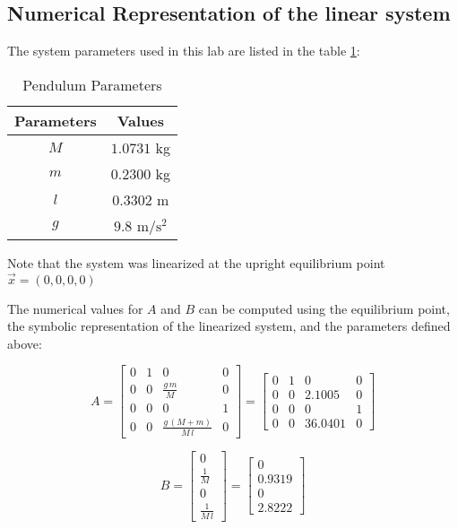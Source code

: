 \documentclass[10pt]{article}
\begin{document}
\subsection{Numerical Representation of the linear system}
The system parameters used in this lab are listed in the table \ref{tab:sys_param}:
\begin{table}[hbt!]
    \centering
    \begin{tabular}{c|c}
    \textbf{Parameters} & \textbf{Values} \\
    \hline
         $M$ & $1.0731$ kg \\
         $m$ & $0.2300$ kg \\
         $l$ & $0.3302$ m \\
         $g$ & $9.8$ m/$\text{s}^2$
    \end{tabular}
    \caption{Pendulum Parameters}
    \label{tab:sys_param}
\end{table}

Note that the system was linearized at the upright equilibrium point $\vec{x} = (0, 0, 0, 0)$

The numerical values for $A$ and $B$ can be computed using the equilibrium point, the symbolic representation of the linearized system, and the parameters defined above:

\begin{equation*}
    A = \begin{bmatrix} 0 & 1 & 0 & 0\\ 0 & 0 & \frac{g\,m}{M} & 0\\ 0 & 0 & 0 & 1\\ 0 & 0 & \frac{g\,\left(M+m\right)}{M\,l} & 0 \end{bmatrix} = \begin{bmatrix} 0 & 1 & 0 & 0\\ 0 & 0 & 2.1005 & 0\\ 0 & 0 & 0 & 1\\ 0 & 0 & 36.0401 & 0 \end{bmatrix}
\end{equation*}

\begin{equation*}
    B = \begin{bmatrix} 0\\ \frac{1}{M}\\ 0\\ \frac{1}{M\,l} \end{bmatrix} = \begin{bmatrix} 0\\ 0.9319\\ 0\\ 2.8222 \end{bmatrix}
\end{equation*}
\end{document}
